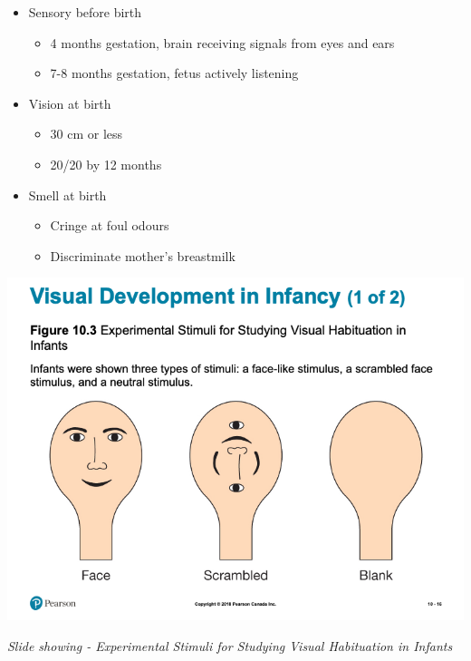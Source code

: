 \documentclass[
]{book}
\providecommand{\tightlist}{%
  \setlength{\itemsep}{0pt}\setlength{\parskip}{0pt}}
\begin{document}
\begin{itemize}
\tightlist
\item
  Sensory before birth

  \begin{itemize}
  \tightlist
  \item
    4 months gestation, brain receiving signals from eyes and ears
  \item
    7-8 months gestation, fetus actively listening
  \end{itemize}
\item
  Vision at birth

  \begin{itemize}
  \tightlist
  \item
    30 cm or less
  \item
    20/20 by 12 months
  \end{itemize}
\item
  Smell at birth

  \begin{itemize}
  \tightlist
  \item
    Cringe at foul odours
  \item
    Discriminate mother's breastmilk
  \end{itemize}
\end{itemize}

\includegraphics{assets/unit_3/slide_16.png}

\emph{Slide showing - Experimental Stimuli for Studying Visual Habituation in Infants}
\end{document}
